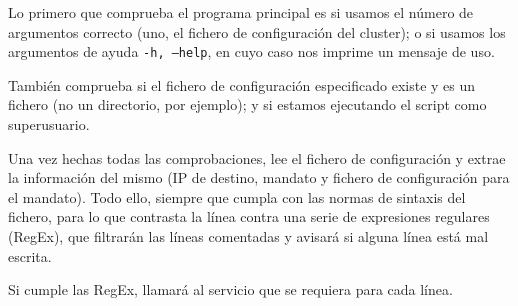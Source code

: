 Lo primero que comprueba el programa principal es si usamos el número de argumentos correcto (uno, el fichero de configuración del cluster); o si usamos los argumentos de ayuda \texttt{-h, --help}, en cuyo caso nos imprime un mensaje de uso.

También comprueba si el fichero de configuración especificado existe y es un fichero (no un directorio, por ejemplo); y si estamos ejecutando el script como superusuario.

Una vez hechas todas las comprobaciones, lee el fichero de configuración y extrae la información del mismo (IP de destino, mandato y fichero de configuración para el mandato). Todo ello, siempre que cumpla con las normas de sintaxis del fichero, para lo que contrasta la línea contra una serie de expresiones regulares (RegEx), que filtrarán las líneas comentadas y avisará si alguna línea está mal escrita.

Si cumple las RegEx, llamará al servicio que se requiera para cada línea.